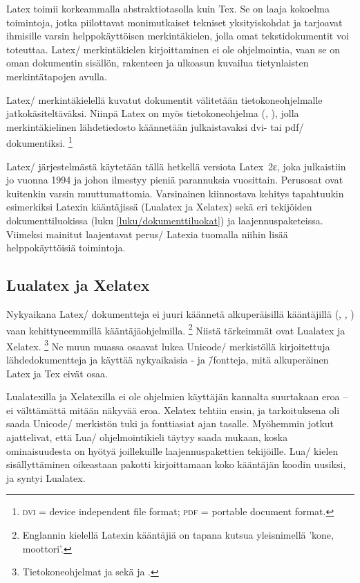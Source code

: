 Latex toimii korkeammalla abstraktiotasolla kuin Tex. Se on laaja
kokoelma toimintoja, jotka piilottavat monimutkaiset tekniset
yksityiskohdat ja tarjoavat ihmisille varsin helppokäyttöisen
merkintäkielen, jolla omat tekstidokumentit voi toteuttaa. Latex\-/
merkintäkielen kirjoittaminen ei ole ohjelmointia, vaan se on oman
dokumentin sisällön, rakenteen ja ulkoasun kuvailua tietynlaisten
merkintätapojen avulla.

Latex\-/ merkintäkielellä kuvatut dokumentit välitetään
tietokoneohjelmalle jatkokäsiteltäväksi. Niinpä Latex on myös
tietokoneohjelma (, ), jolla
merkintäkielinen lähdetiedosto käännetään julkaistavaksi dvi- tai pdf\-/
dokumentiksi.%
\footnote{\textsc{dvi} = device independent file format; \textsc{pdf} =
  portable document format.}

Latex\-/ järjestelmästä käytetään tällä hetkellä versiota Latex~2ε, joka
julkaistiin jo vuonna 1994 ja johon ilmestyy pieniä parannuksia
vuosittain. Perusosat ovat kuitenkin varsin muuttumattomia. Varsinainen
kiinnostava kehitys tapahtuukin esimerkiksi Latexin kääntäjissä
(Lualatex ja Xelatex) sekä eri tekijöiden dokumenttiluokissa (luku
\ref{luku/dokumenttiluokat}) ja laajennuspaketeissa. Viimeksi mainitut
laajentavat perus\-/ Latexia tuomalla niihin lisää helppokäyttöisiä
toimintoja.

\subsection{Lualatex ja Xelatex}

Nykyaikana Latex\-/ dokumentteja ei juuri käännetä alkuperäisillä
kääntäjillä (, , ) vaan
kehittyneemmillä kääntäjäohjelmilla.%
\footnote{Englannin kielellä Latexin kääntäjiä on tapana kutsua
  yleisnimellä  'kone, moottori'.} Niistä tärkeimmät
ovat Lualatex ja Xelatex.%
\footnote{Tietokoneohjelmat  ja  sekä
   ja .} Ne muun muassa osaavat lukea
Unicode\-/ merkistöllä kirjoitettuja lähdedokumentteja ja käyttää
nykyaikaisia - ja  \=/fontteja,
mitä alkuperäinen Latex ja Tex eivät osaa.

Lualatexilla ja Xelatexilla ei ole ohjelmien käyttäjän kannalta
suurtakaan eroa -- ei välttämättä mitään näkyvää eroa. Xelatex tehtiin
ensin, ja tarkoituksena oli saada Unicode\-/ merkistön tuki ja
fonttiasiat ajan tasalle. Myöhemmin jotkut ajattelivat, että Lua\-/
ohjelmointikieli täytyy saada mukaan, koska ominaisuudesta on hyötyä
joillekuille laajennuspakettien tekijöille. Lua\-/ kielen
sisällyttäminen oikeastaan pakotti kirjoittamaan koko kääntäjän koodin
uusiksi, ja syntyi Lualatex.

